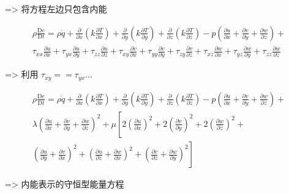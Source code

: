 => 将方程左边只包含内能

$$
	\begin{gathered}
		\rho \frac{\mathrm{D} e}{\mathrm{D} t}=\rho \dot{q}+\frac{\partial}{\partial x}\left(k \frac{\partial T}{\partial x}\right)+\frac{\partial}{\partial y}\left(k \frac{\partial T}{\partial y}\right)+\frac{\partial}{\partial z}\left(k \frac{\partial T}{\partial z}\right)-p\left(\frac{\partial u}{\partial x}+\frac{\partial v}{\partial y}+\frac{\partial w}{\partial z}\right)+ \\
		\tau_{x x} \frac{\partial u}{\partial x}+\tau_{y x} \frac{\partial u}{\partial y}+\tau_{z z} \frac{\partial u}{\partial z}+\tau_{x y} \frac{\partial v}{\partial x}+\tau_{y y} \frac{\partial v}{\partial y}+\tau_{z y} \frac{\partial v}{\partial z}+\tau_{x z} \frac{\partial w}{\partial x}+\tau_{y z} \frac{\partial w}{\partial y}+\tau_{z z} \frac{\partial w}{\partial z}
	\end{gathered}
$$

=> 利用 $\tau_{xy} == \tau_{yx} ...$


$$
	\begin{gathered}
		\rho \frac{\mathrm{D} e}{\mathrm{D} t}=\rho \dot{q}+\frac{\partial}{\partial x}\left(k \frac{\partial T}{\partial x}\right)+\frac{\partial}{\partial y}\left(k \frac{\partial T}{\partial y}\right)+\frac{\partial}{\partial z}\left(k \frac{\partial T}{\partial z}\right)-p\left(\frac{\partial u}{\partial x}+\frac{\partial v}{\partial y}+\frac{\partial w}{\partial z}\right)+ \\
		\lambda\left(\frac{\partial u}{\partial x}+\frac{\partial v}{\partial y}+\frac{\partial w}{\partial z}\right)^{2}+\mu\left[2\left(\frac{\partial u}{\partial x}\right)^{2}+2\left(\frac{\partial v}{\partial y}\right)^{2}+2\left(\frac{\partial w}{\partial z}\right)^{2}+\right. \\
			\left.\left(\frac{\partial u}{\partial y}+\frac{\partial v}{\partial x}\right)^{2}+\left(\frac{\partial u}{\partial z}+\frac{\partial w}{\partial x}\right)^{2}+\left(\frac{\partial v}{\partial z}+\frac{\partial w}{\partial y}\right)^{2}\right]
	\end{gathered}
$$


=> 内能表示的守恒型能量方程

